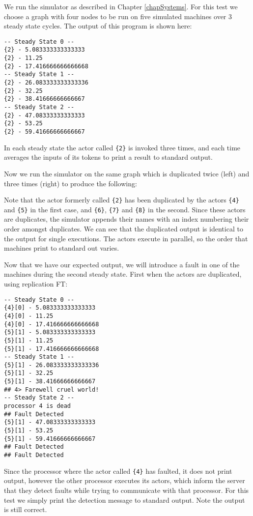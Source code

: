 We run the simulator as described in Chapter \ref{chapSystems}.
For this test we choose a graph with four nodes to be run on five simulated machines over 3 steady state cycles.
The output of this program is shown here:
\begin{multicols}{2}
\begin{verbatim}
-- Steady State 0 --
{2} - 5.083333333333333
{2} - 11.25
{2} - 17.416666666666668
-- Steady State 1 --
{2} - 26.083333333333336
{2} - 32.25
{2} - 38.41666666666667
-- Steady State 2 --
{2} - 47.08333333333333
{2} - 53.25
{2} - 59.41666666666667
\end{verbatim}
\end{multicols}
\noindent In each steady state the actor called \verb={2}= is invoked three times, and each time averages the inputs of its tokens to print a result to standard output.

Now we run the simulator on the same graph which is duplicated twice (left) and three times (right) to produce the following:

\noindent Note that the actor formerly called \verb={2}= has been duplicated by the actors \verb={4}= and \verb={5}= in the first case, and \verb={6}=, \verb={7}= and \verb={8}= in the second.
Since these actors are duplicates, the simulator appends their names with an index numbering their order amongst duplicates.
We can see that the duplicated output is identical to the output for single executions.
The actors execute in parallel, so the order that machines print to standard out varies.

Now that we have our expected output, we will introduce a fault in one of the machines during the second steady state.
First when the actors are duplicated, using replication FT:
\begin{multicols}{2}
\begin{verbatim}
-- Steady State 0 --
{4}[0] - 5.083333333333333
{4}[0] - 11.25
{4}[0] - 17.416666666666668
{5}[1] - 5.083333333333333
{5}[1] - 11.25
{5}[1] - 17.416666666666668
-- Steady State 1 --
{5}[1] - 26.083333333333336
{5}[1] - 32.25
{5}[1] - 38.41666666666667
## 4> Farewell cruel world!
-- Steady State 2 --
processor 4 is dead
## Fault Detected
{5}[1] - 47.08333333333333
{5}[1] - 53.25
{5}[1] - 59.41666666666667
## Fault Detected
## Fault Detected
\end{verbatim}
\end{multicols}
\noindent Since the processor where the actor called \verb={4}= has faulted, it does not print output, however the other processor executes its actors, which inform the server that they detect faults while trying to communicate with that processor.
For this test we simply print the detection message to standard output.
Note the output is still correct.

